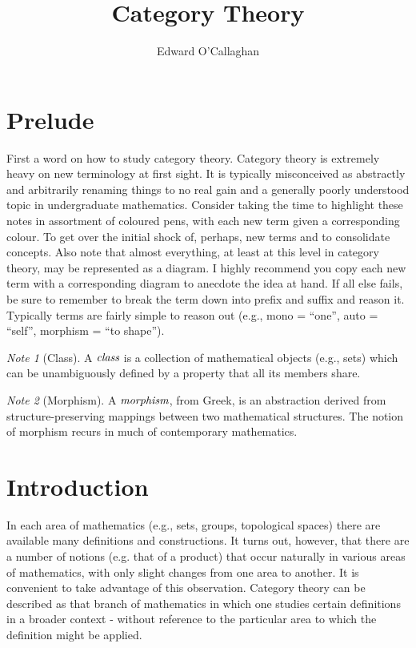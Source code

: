 \documentclass[10pt, oneside, reqno]{amsart}
\title{Category Theory}                               %
\author{Edward O'Callaghan}
\theoremstyle{plain}%
\theoremstyle{definition}
\theoremstyle{remark}
\newtheorem*{note}{Note}
\begin{document}
\maketitle \tableofcontents \clearpage

\section{Prelude} %
\label{sec:purelude}
First a word on how to study category theory. Category theory is extremely heavy on new terminology at first sight.
It is typically misconceived as abstractly and arbitrarily renaming things to no real gain and a generally poorly understood
topic in undergraduate mathematics. Consider taking the time to highlight these notes in assortment of coloured pens,
with each new term given a corresponding colour. To get over the initial shock of, perhaps, new terms and to consolidate concepts.
Also note that almost everything, at least at this level in category theory, may be represented as a diagram.
I highly recommend you copy each new term with a corresponding diagram to anecdote the idea at hand.
If all else fails, be sure to remember to break the term down into prefix and suffix and reason it.
Typically terms are fairly simple to reason out (e.g., mono = ``one'', auto = ``self'', morphism = ``to shape'').

\begin{note}[Class]
 A $\emph{class}$ is a collection of mathematical objects (e.g., sets)
 which can be unambiguously defined by a property that all its members share.
\end{note}

\begin{note}[Morphism]
 A $\emph{morphism}$, from Greek, is an abstraction derived from
 structure-preserving mappings between two mathematical structures.
 The notion of morphism recurs in much of contemporary mathematics.
\end{note}

\section{Introduction} %
\label{sec:introduction}
In each area of mathematics (e.g., sets, groups, topological spaces) there are available many definitions
and constructions. It turns out, however, that there are a number of notions (e.g. that of a product)
that occur naturally in various areas of mathematics, with only slight changes from one area to another.
It is convenient to take advantage of this observation. Category theory can be described as that branch of mathematics
in which one studies certain definitions in a broader context - without reference to the particular area to which
the definition might be applied.
\end{document}
